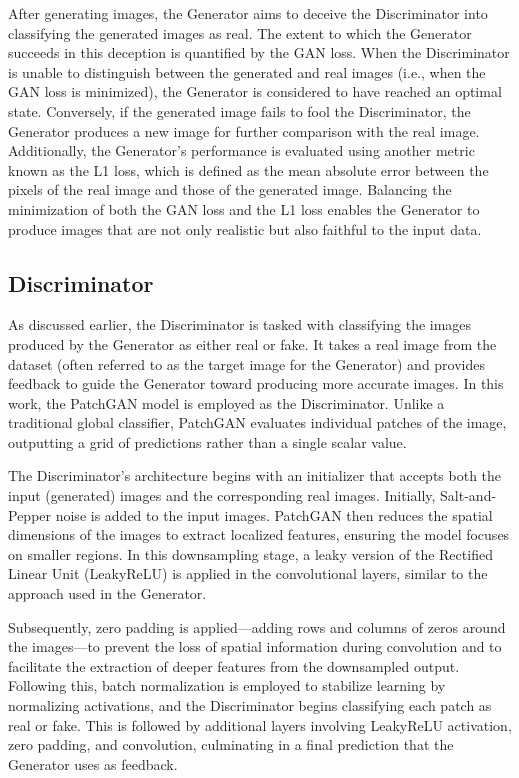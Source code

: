 \documentclass[fleqn,usenatbib,twocolumn]{mnras}
\begin{document}
After generating images, the Generator aims to deceive the Discriminator into classifying the generated images as real. The extent to which the Generator succeeds in this deception is quantified by the GAN loss. When the Discriminator is unable to distinguish between the generated and real images (i.e., when the GAN loss is minimized), the Generator is considered to have reached an optimal state. Conversely, if the generated image fails to fool the Discriminator, the Generator produces a new image for further comparison with the real image. Additionally, the Generator's performance is evaluated using another metric known as the L1 loss, which is defined as the mean absolute error between the pixels of the real image and those of the generated image. Balancing the minimization of both the GAN loss and the L1 loss enables the Generator to produce images that are not only realistic but also faithful to the input data. 

\subsection{Discriminator}
As discussed earlier, the Discriminator is tasked with classifying the images produced by the Generator as either real or fake. It takes a real image from the dataset (often referred to as the target image for the Generator) and provides feedback to guide the Generator toward producing more accurate images. In this work, the PatchGAN model \cite{isola2017image} is employed as the Discriminator. Unlike a traditional global classifier, PatchGAN evaluates individual patches of the image, outputting a grid of predictions rather than a single scalar value.

The Discriminator’s architecture begins with an initializer that accepts both the input (generated) images and the corresponding real images. Initially, Salt-and-Pepper noise is added to the input images. PatchGAN then reduces the spatial dimensions of the images to extract localized features, ensuring the model focuses on smaller regions. In this downsampling stage, a leaky version of the Rectified Linear Unit (LeakyReLU) is applied in the convolutional layers, similar to the approach used in the Generator.

Subsequently, zero padding is applied—adding rows and columns of zeros around the images—to prevent the loss of spatial information during convolution and to facilitate the extraction of deeper features from the downsampled output. Following this, batch normalization is employed to stabilize learning by normalizing activations, and the Discriminator begins classifying each patch as real or fake. This is followed by additional layers involving LeakyReLU activation, zero padding, and convolution, culminating in a final prediction that the Generator uses as feedback.
\end{document}
